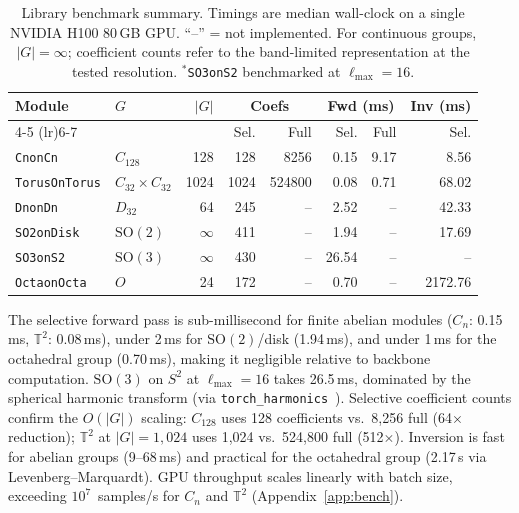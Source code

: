 \documentclass{article}
\theoremstyle{definition}
\theoremstyle{remark}
\newcommand{\SO}{\mathrm{SO}}
\theoremstyle{definition}
\begin{document}
\begin{table}[t]
  \centering
  \caption{Library benchmark summary. Timings are median wall-clock on a
    single NVIDIA H100 80\,GB GPU. ``--'' = not implemented.
    For continuous groups, $|G| = \infty$; coefficient counts refer to the
    band-limited representation at the tested resolution.
    $^*$\texttt{SO3onS2} benchmarked at $\ell_{\max}{=}16$.}
  \label{tab:benchmarks}
  \small
  \setlength{\tabcolsep}{3.5pt}
  \begin{tabular}{llrrrrrr}
    \toprule
    Module & $G$ & $|G|$ & \multicolumn{2}{c}{Coefs} & \multicolumn{2}{c}{Fwd (ms)} & Inv (ms) \\
    \cmidrule(lr){4-5} \cmidrule(lr){6-7}
     & & & Sel. & Full & Sel. & Full & Sel. \\
    \midrule
    \texttt{CnonCn} & $C_{128}$ & 128 & 128 & 8256 & 0.15 & 9.17 & 8.56 \\
    \texttt{TorusOnTorus} & $C_{32}{\times}C_{32}$ & 1024 & 1024 & 524800 & 0.08 & 0.71 & 68.02 \\
    \texttt{DnonDn} & $D_{32}$ & 64 & 245 & -- & 2.52 & -- & 42.33 \\
    \texttt{SO2onDisk} & $\mathrm{SO}(2)$ & $\infty$ & 411 & -- & 1.94 & -- & 17.69 \\
    \texttt{SO3onS2}\rlap{$^*$} & $\mathrm{SO}(3)$ & $\infty$ & 430 & -- & 26.54 & -- & -- \\
    \texttt{OctaonOcta} & $O$ & 24 & 172 & -- & 0.70 & -- & 2172.76 \\
    \bottomrule
  \end{tabular}
\end{table}

The selective forward pass is sub-millisecond for finite abelian modules
($C_n$: 0.15\,ms, $\mathbb{T}^2$: 0.08\,ms), under 2\,ms for
$\SO(2)$/disk (1.94\,ms), and under 1\,ms for the octahedral group
(0.70\,ms), making it negligible relative to backbone computation. $\SO(3)$ on $S^2$ at
$\ell_{\max}{=}16$ takes 26.5\,ms, dominated by the spherical harmonic
transform (via \texttt{torch\_harmonics}~\citep{bonev2023spherical}).
Selective coefficient counts confirm the $O(|G|)$ scaling:
$C_{128}$ uses 128 coefficients vs.\ 8{,}256 full (64$\times$
reduction); $\mathbb{T}^2$ at $|G|{=}1{,}024$ uses 1{,}024 vs.\
524{,}800 full (512$\times$). Inversion is fast for abelian groups
(9--68\,ms) and practical for the octahedral group (2.17\,s via
Levenberg--Marquardt). GPU throughput scales linearly with batch size,
exceeding $10^7$~samples/s for $C_n$ and $\mathbb{T}^2$
(Appendix~\ref{app:bench}).
\end{document}
